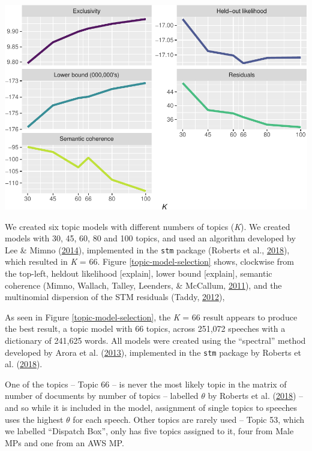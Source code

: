 \documentclass[]{article}
\let\origfigure\figure
\let\endorigfigure\endfigure
\renewenvironment{figure}[1][2] {
    \expandafter\origfigure\expandafter[H]
} {
    \endorigfigure
}
\begin{document}
\begin{figure}
\centering
\includegraphics{methodology_files/figure-latex/topic-model-selection-plot-1.pdf}
\caption{\label{topic-model-selection}Topic Model Selection}
\end{figure}

We created six topic models with different numbers of topics (\emph{K}).
We created models with 30, 45, 60, 80 and 100 topics, and used an
algorithm developed by Lee \& Mimno
(\protect\hyperlink{ref-lee2014c}{2014}), implemented in the
\texttt{stm} package (Roberts et al.,
\protect\hyperlink{ref-roberts2018}{2018}), which resulted in \emph{K} =
66. Figure \ref{topic-model-selection} shows, clockwise from the
top-left, heldout likelihood {[}explain{]}, lower bound {[}explain{]},
semantic coherence (Mimno, Wallach, Talley, Leenders, \& McCallum,
\protect\hyperlink{ref-mimno2011}{2011}), and the multinomial dispersion
of the STM residuals (Taddy, \protect\hyperlink{ref-taddy2012}{2012}),

As seen in Figure \ref{topic-model-selection}, the \emph{K} = 66 result
appears to produce the best result, a topic model with 66 topics, across
251,072 speeches with a dictionary of 241,625 words. All models were
created using the ``spectral'' method developed by Arora et al.
(\protect\hyperlink{ref-arora2013}{2013}), implemented in the
\texttt{stm} package by Roberts et al.
(\protect\hyperlink{ref-roberts2018}{2018}).

One of the topics -- Topic 66 -- is never the most likely topic in the
matrix of number of documents by number of topics -- labelled \(\theta\)
by Roberts et al. (\protect\hyperlink{ref-roberts2018}{2018}) -- and so
while it is included in the model, assignment of single topics to
speeches uses the highest \(\theta\) for each speech. Other topics are
rarely used -- Topic 53, which we labelled ``Dispatch Box'', only has
five topics assigned to it, four from Male MPs and one from an AWS MP.
\end{document}
